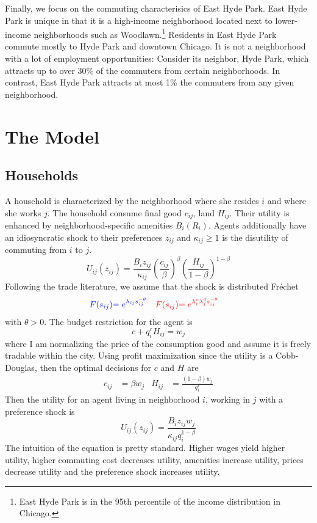 \documentclass[12pt]{article}
\begin{document}
Finally, we focus on the commuting characterisics of East Hyde Park. East Hyde Park is unique in that it is a high-income neighborhood located next to lower-income neighborhoods such as Woodlawn.\footnote{East Hyde Park is in the 95th percentile of the income distribution in Chicago.} Residents in East Hyde Park commute mostly to Hyde Park and downtown Chicago. It is not a neighborhood with a lot of employment opportunities: Consider its neighbor, Hyde Park, which attracts up to over 30\% of the commuters from certain neighborhoods. In contrast, East Hyde Park attracts at most 1\% the commuters from any given neighborhood. 
\section{The Model}


\subsection{Households}
A household is characterized by the neighborhood where she resides $i$ and where she works $j$. The household consume final good $c_{ij}$, land $H_{ij}$. Their utility is enhanced by neighborhood-specific amenities $B_i(R_i)$. Agents additionally have an idiosyncratic shock to their preferences $z_{ij}$ and $\kappa_{ij}\geq 1$ is the disutility of commuting from $i$ to $j$.  \\ 
\begin{equation}
    U_{ij}(z_{ij}) = \frac{B_iz_{ij}}{\kappa_{ij}}\left(\frac{c_{ij}}{\beta}\right)^{\beta}\left(\frac{H_{ij}}{1-\beta}\right)^{1-\beta}
\end{equation}
Following the trade literature, we assume that the shock is distributed Fréchet 
\begin{align*}
    \textcolor{blue}{F(s_{ij})} &\textcolor{blue}{= e^{\lambda_{ij}s_{ij}^{-\theta}}} & \textcolor{red}{F(s_{ij})} &\textcolor{red}{= e^{\lambda^o_{i}\lambda^d_js_{ij}^{-\theta}}}
\end{align*}
with $\theta>0$. 
The budget restriction for the agent is 
\begin{equation*}
    c + q_i^{r}H_{ij} = w_j
\end{equation*}
where I am normalizing the price of the consumption good and assume it is freely tradable within the city. Using profit maximization since the utility is a Cobb-Douglas, then the optimal decisions for $c$ and $H$ are  
\begin{align*}
    c_{ij} &= \beta w_j & H_{ij}&= \boxed{ \frac{(1-\beta)w_j}{q_i^{r}}}
\end{align*}
Then the utility for an agent living in neighborhood $i$, working in $j$ with a preference shock is 
\begin{equation}
    U_{ij}(z_{ij}) = \frac{B_iz_{ij}w_j}{\kappa_{ij}q_{i}^{1-\beta}}
\end{equation}
The intuition of the equation is pretty standard. Higher wages yield higher utility, higher commuting cost decreases utility, amenities increase utility, prices decrease utility and the preference shock increases utility. 
\end{document}
